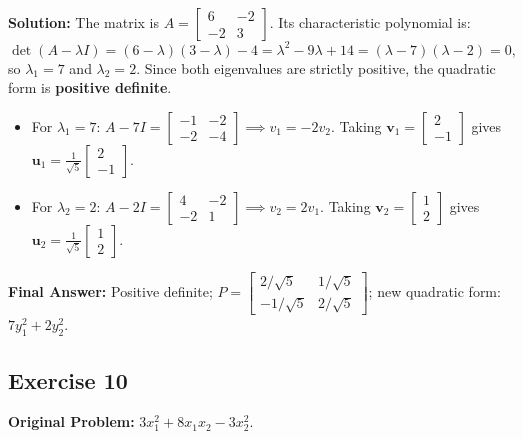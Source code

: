 \documentclass[11pt, letterpaper]{article}
\theoremstyle{definition}
\theoremstyle{remark}
\begin{document}
\textbf{Solution:}
The matrix is $A = \begin{bmatrix} 6 & -2 \\ -2 & 3 \end{bmatrix}$. Its characteristic polynomial is:
\[
\det(A - \lambda I) = (6-\lambda)(3-\lambda) - 4 = \lambda^2 - 9\lambda + 14 = (\lambda - 7)(\lambda - 2) = 0,
\]
so $\lambda_1 = 7$ and $\lambda_2 = 2$. Since both eigenvalues are strictly positive, the quadratic form is \textbf{positive definite}.
\begin{itemize}
    \item For $\lambda_1 = 7$: $A - 7I = \begin{bmatrix} -1 & -2 \\ -2 & -4 \end{bmatrix} \implies v_1 = -2v_2$. Taking $\mathbf{v}_1 = \begin{bmatrix} 2 \\ -1 \end{bmatrix}$ gives $\mathbf{u}_1 = \frac{1}{\sqrt{5}}\begin{bmatrix} 2 \\ -1 \end{bmatrix}$.
    \item For $\lambda_2 = 2$: $A - 2I = \begin{bmatrix} 4 & -2 \\ -2 & 1 \end{bmatrix} \implies v_2 = 2v_1$. Taking $\mathbf{v}_2 = \begin{bmatrix} 1 \\ 2 \end{bmatrix}$ gives $\mathbf{u}_2 = \frac{1}{\sqrt{5}}\begin{bmatrix} 1 \\ 2 \end{bmatrix}$.
\end{itemize}
\textbf{Final Answer:} Positive definite; $P = \begin{bmatrix} 2/\sqrt{5} & 1/\sqrt{5} \\ -1/\sqrt{5} & 2/\sqrt{5} \end{bmatrix}$; new quadratic form: $7y_1^2 + 2y_2^2$.

\hrulefill

\subsection*{Exercise 10}
\textbf{Original Problem:} $3x_1^2 + 8x_1x_2 - 3x_2^2$.
\end{document}
